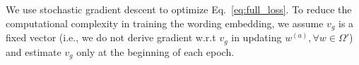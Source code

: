 

We use stochastic gradient descent to optimize Eq.~\eqref{eq:full_loss}. To reduce the computational complexity in training the wording embedding, we assume $v_g$ is a fixed vector (i.e., we do not derive gradient w.r.t $v_g$ in updating $w^{(a)}, \forall w\in \Omega'$) and estimate $v_g$ only at the beginning of each epoch.  




